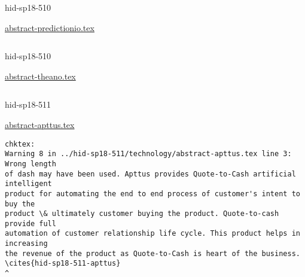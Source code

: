 

\begin{IU}

hid-sp18-510

\href{https://github.com/cloudmesh-community/hid-sp18-510/blob/master//technology/abstract-predictionio.tex}{abstract-predictionio.tex}

\begin{tiny}
\begin{verbatim}
\end{verbatim}
\end{tiny}
\end{IU}



\begin{IU}

hid-sp18-510

\href{https://github.com/cloudmesh-community/hid-sp18-510/blob/master//technology/abstract-theano.tex}{abstract-theano.tex}

\begin{tiny}
\begin{verbatim}
\end{verbatim}
\end{tiny}
\end{IU}



\begin{IU}

hid-sp18-511

\href{https://github.com/cloudmesh-community/hid-sp18-511/blob/master//technology/abstract-apttus.tex}{abstract-apttus.tex}

\begin{tiny}
\begin{verbatim}
chktex:
Warning 8 in ../hid-sp18-511/technology/abstract-apttus.tex line 3: Wrong length
of dash may have been used. Apttus provides Quote-to-Cash artificial intelligent
product for automating the end to end process of customer's intent to buy the
product \& ultimately customer buying the product. Quote-to-cash provide full
automation of customer relationship life cycle. This product helps in increasing
the revenue of the product as Quote-to-Cash is heart of the business.
\cites{hid-sp18-511-apttus}
^
\end{verbatim}
\end{tiny}
\end{IU}

